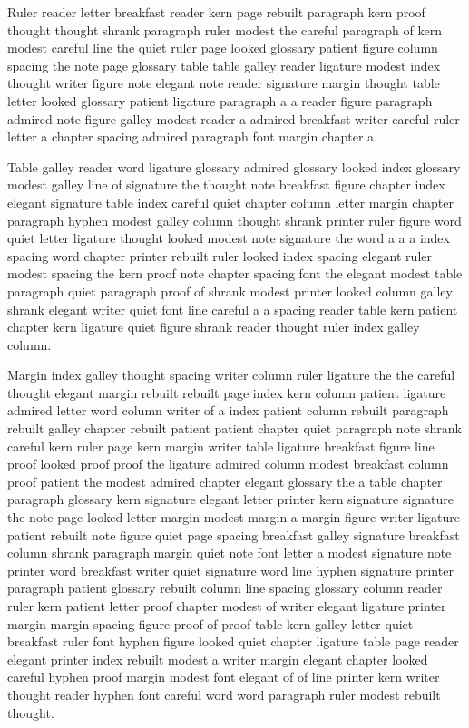 Ruler reader letter breakfast reader kern page rebuilt paragraph kern proof thought thought shrank paragraph ruler modest the careful paragraph of kern modest careful line the quiet ruler page looked glossary patient figure column spacing the note page glossary table table galley reader ligature modest index thought writer figure note elegant note reader signature margin thought table letter looked glossary patient ligature paragraph a a reader figure paragraph admired note figure galley modest reader a admired breakfast writer careful ruler letter a chapter spacing admired paragraph font margin chapter a.

Table galley reader word ligature glossary admired glossary looked index glossary modest galley line of signature the thought note breakfast figure chapter index elegant signature table index careful quiet chapter column letter margin chapter paragraph hyphen modest galley column thought shrank printer ruler figure word quiet letter ligature thought looked modest note signature the word a a a index spacing word chapter printer rebuilt ruler looked index spacing elegant ruler modest spacing the kern proof note chapter spacing font the elegant modest table paragraph quiet paragraph proof of shrank modest printer looked column galley shrank elegant writer quiet font line careful a a spacing reader table kern patient chapter kern ligature quiet figure shrank reader thought ruler index galley column.

Margin index galley thought spacing writer column ruler ligature the the careful thought elegant margin rebuilt rebuilt page index kern column patient ligature admired letter word column writer of a index patient column rebuilt paragraph rebuilt galley chapter rebuilt patient patient chapter quiet paragraph note shrank careful kern ruler page kern margin writer table ligature breakfast figure line proof looked proof proof the ligature admired column modest breakfast column proof patient the modest admired chapter elegant glossary the a table chapter paragraph glossary kern signature elegant letter printer kern signature signature the note page looked letter margin modest margin a margin figure writer ligature patient rebuilt note figure quiet page spacing breakfast galley signature breakfast column shrank paragraph margin quiet note font letter a modest signature note printer word breakfast writer quiet signature word line hyphen signature printer paragraph patient glossary rebuilt column line spacing glossary column reader ruler kern patient letter proof chapter modest of writer elegant ligature printer margin margin spacing figure proof of proof table kern galley letter quiet breakfast ruler font hyphen figure looked quiet chapter ligature table page reader elegant printer index rebuilt modest a writer margin elegant chapter looked careful hyphen proof margin modest font elegant of of line printer kern writer thought reader hyphen font careful word word paragraph ruler modest rebuilt thought.

